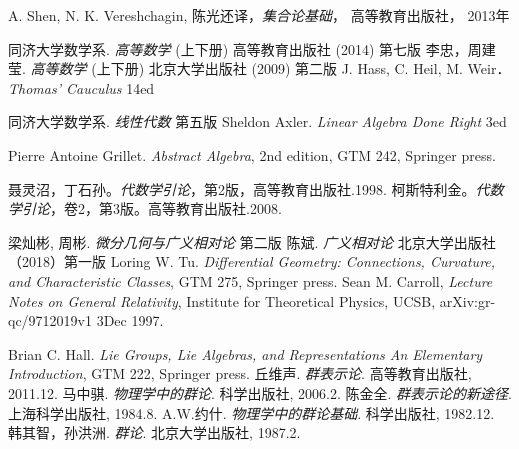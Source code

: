 
\begin{thebibliography}{99}

A. Shen, N. K. Vereshchagin, 陈光还译，\textsl{集合论基础}， 高等教育出版社， 2013年

同济大学数学系. \textsl{高等数学} (上下册) 高等教育出版社 (2014) 第七版
李忠，周建莹. \textsl{高等数学} (上下册) 北京大学出版社 (2009) 第二版
J. Hass, C. Heil, M. Weir．\textsl{Thomas' Cauculus} 14ed

同济大学数学系. \textsl{线性代数} 第五版
Sheldon Axler. \textsl{Linear Algebra Done Right} 3ed

Pierre Antoine Grillet. \textsl{Abstract Algebra}, 2nd edition, GTM 242, Springer press. 

聂灵沼，丁石孙。\textsl{代数学引论}，第2版，高等教育出版社.1998.
柯斯特利金。\textsl{代数学引论}，卷2，第3版。高等教育出版社.2008.

梁灿彬, 周彬. \textsl{微分几何与广义相对论} 第二版
陈斌. \textsl{广义相对论} 北京大学出版社（2018）第一版
Loring W. Tu. \textsl{Differential Geometry: Connections, Curvature, and Characteristic Classes}, GTM 275, Springer press. 
Sean M. Carroll, \textsl{Lecture Notes on General Relativity}, Institute for Theoretical Physics, UCSB, arXiv:gr-qc/9712019v1 3Dec 1997. 

Brian C. Hall. \textsl{Lie Groups, Lie Algebras, and Representations An Elementary Introduction}, GTM 222, Springer press. 
丘维声. \textsl{群表示论}. 高等教育出版社, 2011.12.
马中骐. \textsl{物理学中的群论}. 科学出版社, 2006.2.
陈金全. \textsl{群表示论的新途径}. 上海科学出版社, 1984.8.
A.W.约什. \textsl{物理学中的群论基础}. 科学出版社, 1982.12.
韩其智，孙洪洲. \textsl{群论}. 北京大学出版社, 1987.2.



\end{thebibliography}
